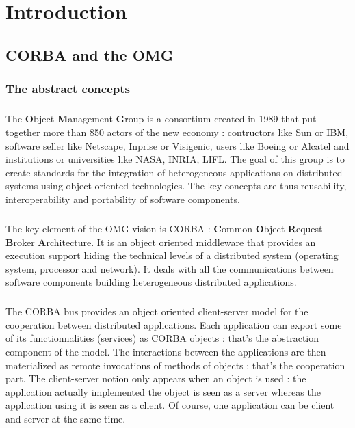 \chapter{Introduction}

\section{CORBA and the OMG}

\subsection{The abstract concepts}

\paragraph{}The {\bf O}bject {\bf M}anagement {\bf G}roup is a consortium created in 1989 
that put together more than 850 actors of the new economy :
contructors like Sun or IBM, software seller like Netscape, Inprise or Visigenic, users like Boeing or Alcatel and institutions or
universities like NASA, INRIA, LIFL. The goal of this group is to create standards for the integration of heterogeneous applications
on distributed systems using object oriented technologies. The key concepts are thus reusability, interoperability and portability
of software components.

\paragraph{}The key element of the OMG vision is CORBA : {\bf C}ommon {\bf O}bject {\bf R}equest {\bf B}roker {\bf A}rchitecture.
It is an object oriented middleware that provides an execution support hiding the technical levels of a distributed system (operating
system, processor and network). It deals with all the communications between software components building heterogeneous distributed
applications.

\paragraph{}The CORBA bus provides an object oriented client-server model for the cooperation between distributed applications.
Each application can export some of its functionnalities (services) as CORBA objects : that's the abstraction component of the model.
The interactions between the applications are then materialized as remote invocations of methods of objects : that's the cooperation part.
The client-server notion only appears when an object is used : the application actually implemented the object is seen as a server
whereas the application using it is seen as a client. Of course, one
application can be client and server at the same time.

